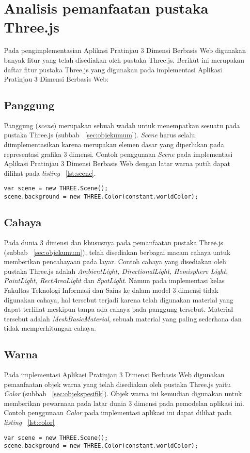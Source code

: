 \section{Analisis pemanfaatan pustaka Three.js}
\label{sec:pemanfaatanthreejs}
Pada pengimplementasian Aplikasi Pratinjau 3 Dimensi Berbasis Web digunakan banyak fitur yang telah disediakan oleh pustaka Three.js. Berikut ini merupakan daftar fitur pustaka Three.js yang digunakan pada implementasi Aplikasi Pratinjau 3 Dimensi Berbasis Web:

\subsection{Panggung}
Panggung ({\it scene}) merupakan sebuah wadah untuk menempatkan sesuatu pada pustaka Three.js (subbab ~\ref{sec:objekumum}). {\it Scene} harus selalu diimplementasikan karena merupakan elemen dasar yang diperlukan pada representasi grafika 3 dimensi. Contoh penggunaan {\it Scene} pada implementasi Aplikasi Pratinjau 3 Dimensi Berbasis Web dengan latar warna putih dapat dilihat pada {\it listing} ~\ref{lst:scene}.
\begin{lstlisting}[caption={Contoh penggunaan {\it Scene}}, label={lst:scene},captionpos=b]
var scene = new THREE.Scene();
scene.background = new THREE.Color(constant.worldColor);
\end{lstlisting}

\subsection{Cahaya}
Pada dunia 3 dimensi dan khususnya pada pemanfaatan pustaka Three.js (subbab ~\ref{sec:objekumum}), telah disediakan berbagai macam cahaya untuk memberikan pencahayaan pada layar. Contoh cahaya yang disediakan oleh pustaka Three.js adalah {\it AmbientLight, DirectionalLight, Hemisphere Light, PointLight, RectAreaLight} dan {\it SpotLight}. Namun pada implementasi kelas Fakultas Teknologi Informasi dan Sains ke dalam model 3 dimensi tidak digunakan cahaya, hal tersebut terjadi karena telah digunakan material yang dapat terlihat meskipun tanpa ada cahaya pada panggung tersebut. Material tersebut adalah {\it MeshBasicMaterial}, sebuah material yang paling sederhana dan tidak memperhitungan cahaya.

\subsection{Warna}
Pada implementasi Aplikasi Pratinjau 3 Dimensi Berbasis Web digunakan pemanfaatan objek warna yang telah disediakan oleh pustaka Three.js yaitu {\it Color} (subbab ~\ref{sec:objekspesifik}). Objek warna ini kemudian digunakan untuk memberikan pewarnaan pada latar dunia 3 dimensi pada pemodelan aplikasi ini. Contoh penggunaan {\it Color} pada implementasi aplikasi ini dapat dilihat pada {\it listing} ~\ref{lst:color}
\begin{lstlisting}[caption={Contoh penggunaan {\it Color}}, label={lst:color},captionpos=b]
var scene = new THREE.Scene();
scene.background = new THREE.Color(constant.worldColor);
\end{lstlisting}

